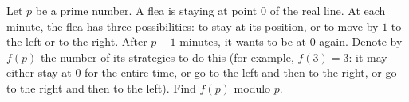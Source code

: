 \documentclass{article}
\begin{document}
\setlength{\parindent}{0pt}
Let $p$ be a prime number. A flea is staying at point $0$ of the real line. At each minute, the flea has three possibilities: to stay at its position, or to move by $1$ to the left or to the right. After $p - 1$ minutes, it wants to be at $0$ again. Denote by $f(p)$ the number of its strategies to do this (for example, $f(3) = 3$: it may either stay at $0$ for the entire time, or go to the left and then to the right, or go to the right and then to the left). Find $f(p)$ modulo $p$.
\end{document}

